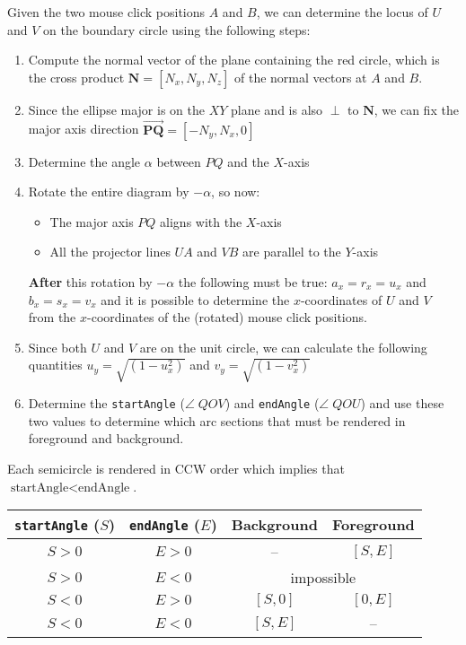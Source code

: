 \documentclass{article}
\begin{document}
Given the two mouse click positions $A$ and $B$, we can determine the locus
of $U$ and $V$ on the boundary circle using the following steps:

\begin{enumerate}
    \item Compute the normal vector of the plane containing the red circle,
          which is the cross product $\mathbf N = [N_x, N_y, N_z]$ of the normal vectors at $A$ and $B$.
    \item Since the ellipse major is on the $XY$ plane and is also $\perp$ to $\mathbf N$, we can fix the major axis direction $\vec{\mathbf {PQ}} = [-N_y, N_x, 0]$
    \item Determine the angle $\alpha$ between $PQ$ and the $X$-axis
    \item Rotate the entire diagram by $-\alpha$, so now:
          \begin{itemize}
              \item The major axis $PQ$ aligns with the $X$-axis
              \item All the projector lines $UA$ and $VB$ are parallel to the $Y$-axis
          \end{itemize}
          \textbf{After} this rotation by $-\alpha$ the following must be true: $a_x = r_x = u_x$  and $b_x = s_x = v_x$ and it is possible to determine the $x$-coordinates of $U$ and $V$ from the $x$-coordinates of the (rotated) mouse click positions.


    \item Since both $U$ and $V$ are on the unit circle, we can calculate the following quantities $u_y = \sqrt{(1 - u_x^2)}$ and $v_y = \sqrt{(1 - v_x^2)}$
    \item Determine the \verb|startAngle| ($\angle\; QOV$) and \verb|endAngle| ($\angle\; QOU$) and use these two values to determine which arc sections that must be rendered in foreground and background.

\end{enumerate}

Each semicircle is rendered in CCW order which implies that $\text{startAngle} < \text{endAngle}$.

\begin{tabular}{cccc}
    \toprule
    \verb|startAngle| ($S$) & \verb|endAngle| ($E$) & Background                     & Foreground \\
    \midrule
    $S> 0$                       & $E> 0$                       & --                             & $[S,E]$    \\
    $S>0$                        & $E<0$                        & \multicolumn{2}{c}{impossible}              \\
    $S< 0$                       & $E> 0$                       & $[S,0]$                        & $[0,E]$    \\
    $S< 0$                       & $E< 0$                       & $[S,E]$                        & --         \\
    \bottomrule
\end{tabular}
\end{document}
